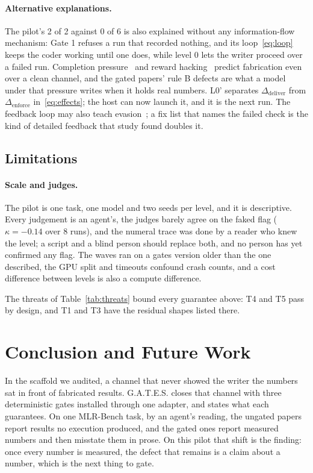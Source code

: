 \documentclass[sigconf,anonymous]{aamas}
\newcommand{\gates}{G.A.T.E.S.}
\begin{document}
\paragraph{Alternative explanations.}
The pilot's 2 of 2 against 0 of 6 is also explained without any information-flow mechanism: Gate 1 refuses a run that recorded nothing, and its loop~\eqref{eq:loop} keeps the coder working until one does, while level 0 lets the writer proceed over a failed run.
Completion pressure~\cite{yang2026sciintegrity} and reward hacking~\cite{huang2026rewardhacking} predict fabrication even over a clean channel, and the gated papers' rule B defects are what a model under that pressure writes when it holds real numbers.
L0' separates $\Delta_{\mathrm{deliver}}$ from $\Delta_{\mathrm{enforce}}$ in~\eqref{eq:effects}; the host can now launch it, and it is the next run.
The feedback loop may also teach evasion~\cite{huang2026rewardhacking}; a fix list that names the failed check is the kind of detailed feedback that study found doubles it.

\subsection{Limitations}

\paragraph{Scale and judges.}
The pilot is one task, one model and two seeds per level, and it is descriptive.
Every judgement is an agent's, the judges barely agree on the faked flag ($\kappa = -0.14$ over 8 runs), and the numeral trace was done by a reader who knew the level; a script and a blind person should replace both, and no person has yet confirmed any flag.
The waves ran on a gates version older than the one described, the GPU split and timeouts confound crash counts, and a cost difference between levels is also a compute difference.

The threats of Table~\ref{tab:threats} bound every guarantee above: T4 and T5 pass by design, and T1 and T3 have the residual shapes listed there.

\section{Conclusion and Future Work}

In the scaffold we audited, a channel that never showed the writer the numbers sat in front of fabricated results.
\gates{} closes that channel with three deterministic gates installed through one adapter, and states what each guarantees.
On one MLR-Bench task, by an agent's reading, the ungated papers report results no execution produced, and the gated ones report measured numbers and then misstate them in prose.
On this pilot that shift is the finding: once every number is measured, the defect that remains is a claim about a number, which is the next thing to gate.
\end{document}
